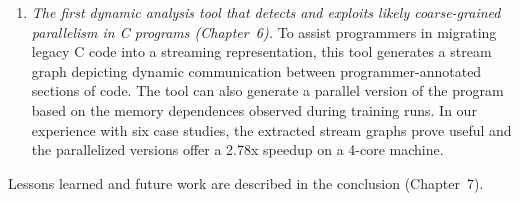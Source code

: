 \begin{enumerate}
\item {\it The first dynamic analysis tool that detects and exploits
  likely coarse-grained parallelism in C programs (Chapter~6).}  To
  assist programmers in migrating legacy C code into a streaming
  representation, this tool generates a stream graph depicting dynamic
  communication between programmer-annotated sections of code.  The
  tool can also generate a parallel version of the program based on
  the memory dependences observed during training runs.  In our
  experience with six case studies, the extracted stream graphs prove
  useful and the parallelized versions offer a 2.78x speedup on a
  4-core machine.

\end{enumerate}


\noindent Lessons learned and future work are described in the
conclusion (Chapter~7).
